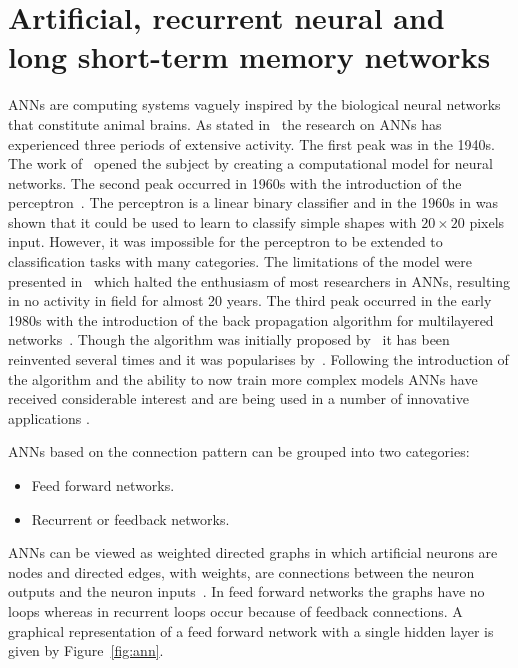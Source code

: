 \section{Artificial, recurrent neural and long short-term memory networks}\label{section:artificial_neural_networks}

ANNs are computing systems vaguely inspired by the biological neural networks
that constitute animal brains. As stated in~\cite{Jain1996} the research on ANNs
has experienced three periods of extensive activity. The first peak was in the
1940s. The work of~\cite{McCulloch1943} opened the subject by creating a
computational model for neural networks. The second peak occurred in 1960s with
the introduction of the perceptron~\cite{Rosenblatt1958}. The perceptron is a
linear binary classifier and in the 1960s in was shown that it could be used to
learn to classify simple shapes with \(20\times20\) pixels input. However, it
was impossible for the perceptron to be extended to classification tasks with
many categories. The limitations of the model were presented
in~\cite{Minsky1969} which halted the enthusiasm of most researchers in ANNs,
resulting in no activity in field for almost 20 years. The third peak occurred
in the early 1980s with the introduction of the back propagation algorithm for
multilayered networks~\cite{Werbos1974}. Though the algorithm was initially
proposed by~\cite{Werbos1974} it has been reinvented several times and it was
popularises by~\cite{McClelland1986}. Following the introduction of the
algorithm and the ability to now train more complex models ANNs have received
considerable interest and are being used in a number of innovative applications
\cite{Covington2016, Kalogirou2000}.

ANNs based on the connection pattern can be grouped into two categories:

\begin{itemize}
    \item Feed forward networks.
    \item Recurrent or feedback networks.
\end{itemize}

ANNs can be viewed as weighted directed graphs in which artificial neurons are
nodes and directed edges, with weights, are connections between the neuron
outputs and the neuron inputs~\cite{Jain1996}. In feed forward networks the
graphs have no loops whereas in recurrent loops occur because of feedback
connections. A graphical representation of a feed forward network with a single
hidden layer is given by Figure~\ref{fig:ann}.

